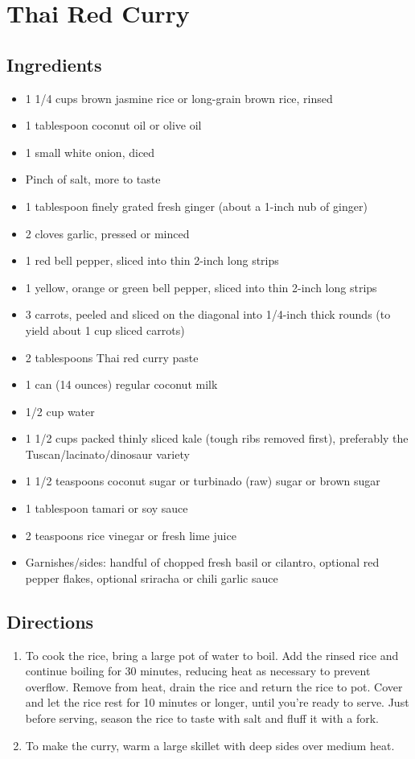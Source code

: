 \documentclass[oneside,11pt]{book}
\newcommand{\Ingredients}[1]{
    \subsection*{Ingredients}
    \begin{itemize} 
        #1 
    \end{itemize}
}
\newcommand{\Directions}[1]{
    \subsection*{Directions}
    \begin{enumerate} 
        #1 
    \end{enumerate}
}
\newcommand{\recipe}[3]{
    \pagebreak
    \section*{ \hspace{-12pt} #1 }
    \addcontentsline{toc}{section}{ \hspace{-6pt} #1 }
    
    \begin{minipage}[t]{0.35\textwidth}
        #2
    \end{minipage}
    \hspace{0.05\textwidth}
    \begin{minipage}[t]{0.6\textwidth}
        #3
    \end{minipage}
}
\begin{document}
    \recipe{Thai Red Curry}{
        \Ingredients{
            \item 1 1/4 cups brown jasmine rice or long-grain brown rice, rinsed
            \item 1 tablespoon coconut oil or olive oil
            \item 1 small white onion, diced
            \item Pinch of salt, more to taste
            \item 1 tablespoon finely grated fresh ginger (about a 1-inch nub of ginger)
            \item 2 cloves garlic, pressed or minced
            \item 1 red bell pepper, sliced into thin 2-inch long strips
            \item 1 yellow, orange or green bell pepper, sliced into thin 2-inch long strips
            \item 3 carrots, peeled and sliced on the diagonal into 1/4-inch thick rounds (to yield about 1 cup sliced carrots)
            \item 2 tablespoons Thai red curry paste
            \item 1 can (14 ounces) regular coconut milk
            \item 1/2 cup water
            \item 1 1/2 cups packed thinly sliced kale (tough ribs removed first), preferably the Tuscan/lacinato/dinosaur variety
            \item 1 1/2 teaspoons coconut sugar or turbinado (raw) sugar or brown sugar
            \item 1 tablespoon tamari or soy sauce
            \item 2 teaspoons rice vinegar or fresh lime juice
            \item Garnishes/sides: handful of chopped fresh basil or cilantro, optional red pepper flakes, optional sriracha or chili garlic sauce
        }
    }{
        \Directions{
            \item To cook the rice, bring a large pot of water to boil. 
                Add the rinsed rice and continue boiling for 30 minutes, reducing heat as necessary to prevent overflow. 
                Remove from heat, drain the rice and return the rice to pot. 
                Cover and let the rice rest for 10 minutes or longer, until you're ready to serve. 
                Just before serving, season the rice to taste with salt and fluff it with a fork.
            \item To make the curry, warm a large skillet with deep sides over medium heat. 
}}
\end{document}
